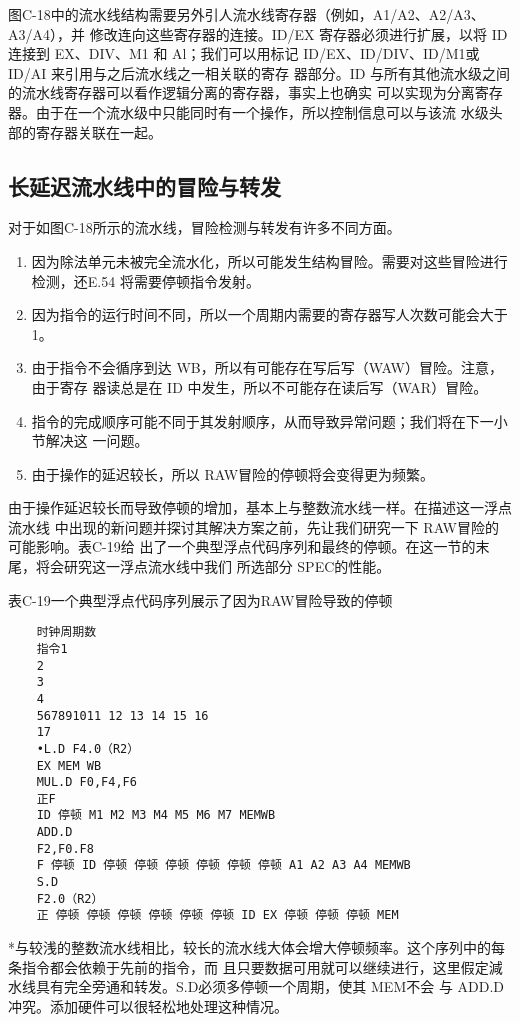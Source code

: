 图C-18中的流水线结构需要另外引人流水线寄存器（例如，A1/A2、A2/A3、A3/A4），并
修改连向这些寄存器的连接。ID/EX 寄存器必须进行扩展，以将 ID 连接到 EX、DIV、M1 和
Al；我们可以用标记 ID/EX、ID/DIV、ID/M1或 ID/AI 来引用与之后流水线之一相关联的寄存
器部分。ID 与所有其他流水级之间的流水线寄存器可以看作逻辑分离的寄存器，事实上也确实
可以实现为分离寄存器。由于在一个流水级中只能同时有一个操作，所以控制信息可以与该流
水级头部的寄存器关联在一起。

\subsection{长延迟流水线中的冒险与转发}
对于如图C-18所示的流水线，冒险检测与转发有许多不同方面。
\begin{enumerate}
    \item 因为除法单元未被完全流水化，所以可能发生结构冒险。需要对这些冒险进行检测，还E.54
    将需要停顿指令发射。
    \item 因为指令的运行时间不同，所以一个周期内需要的寄存器写人次数可能会大于1。
    \item 由于指令不会循序到达 WB，所以有可能存在写后写（WAW）冒险。注意，由于寄存
    器读总是在 ID 中发生，所以不可能存在读后写（WAR）冒险。
    \item 指令的完成顺序可能不同于其发射顺序，从而导致异常问题；我们将在下一小节解决这
    一问题。
    \item 由于操作的延迟较长，所以 RAW冒险的停顿将会变得更为频繁。
\end{enumerate}

由于操作延迟较长而导致停顿的增加，基本上与整数流水线一样。在描述这一浮点流水线
中出现的新问题并探讨其解决方案之前，先让我们研究一下 RAW冒险的可能影响。表C-19给
出了一个典型浮点代码序列和最终的停顿。在这一节的末尾，将会研究这一浮点流水线中我们
所选部分 SPEC的性能。

表C-19一个典型浮点代码序列展示了因为RAW冒险导致的停顿
\begin{verbatim}
    时钟周期数
    指令1
    2
    3
    4
    567891011 12 13 14 15 16
    17
    •L.D F4.0（R2）
    EX MEM WB
    MUL.D F0,F4,F6
    正F
    ID 停顿 M1 M2 M3 M4 M5 M6 M7 MEMWB
    ADD.D
    F2,F0.F8
    F 停顿 ID 停顿 停顿 停顿 停顿 停顿 停顿 A1 A2 A3 A4 MEMWB
    S.D
    F2.0（R2）
    正 停顿 停顿 停顿 停顿 停顿 停顿 ID EX 停顿 停顿 停顿 MEM
\end{verbatim}
*与较浅的整数流水线相比，较长的流水线大体会增大停顿频率。这个序列中的每条指令都会依赖于先前的指令，而
且只要数据可用就可以继续进行，这里假定減水线具有完全旁通和转发。S.D必须多停顿一个周期，使其 MEM不会
与 ADD.D冲究。添加硬件可以很轻松地处理这种情况。

